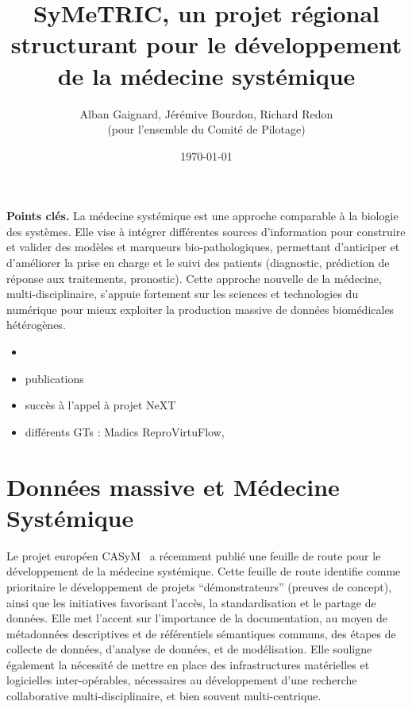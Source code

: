 \documentclass[a4paper,11pt]{article}
\title{\bf SyMeTRIC, un projet régional structurant pour le développement de la médecine systémique}
\author{
  Alban Gaignard, Jérémive Bourdon, Richard Redon \\(pour l'ensemble du Comité de Pilotage)
}
\date{\today}
\theoremstyle{definition}
\begin{document}
\parindent=0pt
\thispagestyle{empty}
\renewcommand{\labelitemi}{$\bullet$}
\renewcommand{\labelitemii}{$\circ$}
\renewcommand{\labelitemiii}{$\diamond$}


\maketitle 

\begin{tcolorbox}
\textbf{Points clés.} 
{\small La médecine systémique est une approche comparable à la biologie des systèmes. Elle vise à intégrer différentes sources d’information pour construire et valider des modèles et marqueurs bio-pathologiques, permettant d’anticiper et d’améliorer la prise en charge et le suivi des patients (diagnostic, prédiction de réponse aux traitements, pronostic).  Cette approche nouvelle de la médecine, multi-disciplinaire, s’appuie fortement sur les sciences et technologies du numérique pour mieux exploiter la production massive de données biomédicales hétérogènes. }
    \begin{itemize}
        \item 
        \item publications 
        \item succès à l'appel à projet NeXT
        \item différents GTs : Madics ReproVirtuFlow, 
    \end{itemize}
\end{tcolorbox}

\section{Données massive et Médecine Systémique}
Le projet européen CASyM~\cite{} a récemment publié une feuille de route pour le développement de la médecine systémique. Cette feuille de route identifie comme prioritaire le développement de projets “démonstrateurs” (preuves de concept), ainsi que les initiatives favorisant l’accès, la standardisation et le partage de données. Elle met l’accent sur l’importance de la documentation, au moyen de métadonnées descriptives et de référentiels sémantiques communs, des étapes de collecte de données, d’analyse de données, et de modélisation. Elle souligne également la nécessité de mettre en place des infrastructures matérielles et logicielles inter-opérables, nécessaires au développement d’une recherche collaborative multi-disciplinaire, et bien souvent multi-centrique.
\end{document}
